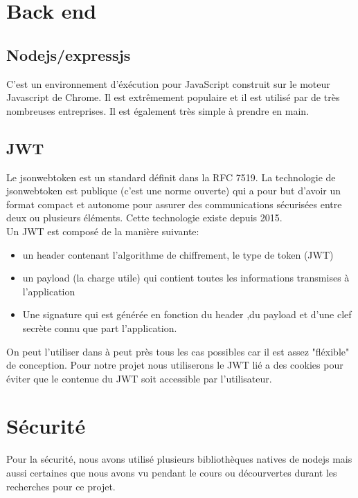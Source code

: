 \documentclass[a4paper,12pt]{report}
\begin{document}
\section{Back end}

\subsection{Nodejs/expressjs}
C'est un environnement d'éxécution pour JavaScript construit sur le moteur Javascript de Chrome. Il est extrêmement populaire et il est utilisé par de très nombreuses entreprises. Il est également très simple à prendre en main.

\subsection{JWT}

Le jsonwebtoken est un standard définit dans la RFC 7519. 
La technologie de jsonwebtoken est publique (c'est une norme ouverte) qui a pour but d'avoir un format compact et autonome pour assurer des communications sécurisées entre deux ou plusieurs éléments.
Cette technologie existe depuis 2015.\\
Un JWT est composé de la manière suivante:

\begin{itemize}
\item un header contenant l'algorithme de chiffrement, le type de token (JWT)
\item un payload (la charge utile) qui contient toutes les informations transmises à l'application
\item Une signature qui est générée en fonction du header ,du payload et d'une clef secrète connu que part l'application.\\
\end{itemize}

On peut l'utiliser dans à peut près tous les cas possibles car il est assez "fléxible" de conception. 
Pour notre projet nous utiliserons le JWT lié a des cookies pour éviter que le contenue du JWT soit accessible par l'utilisateur.

\section{Sécurité}
Pour la sécurité, nous avons utilisé plusieurs bibliothèques natives de nodejs mais aussi certaines que nous avons vu pendant le cours ou décourvertes durant les recherches pour ce projet.
\end{document}
